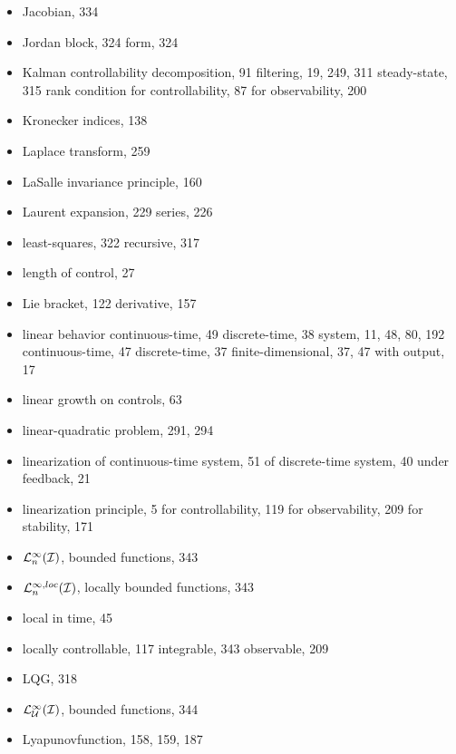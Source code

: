 \begin{itemize}
  \indexspace

  \item Jacobian, 334
  \item Jordan
    \subitem block, 324
    \subitem form, 324

  \indexspace

  \item Kalman
    \subitem controllability decomposition, 91
    \subitem filtering, 19, 249, 311
      \subsubitem steady-state, 315
    \subitem rank condition
      \subsubitem for controllability, 87
      \subsubitem for observability, 200
  \item Kronecker indices, 138

  \indexspace

  \item Laplace transform, 259
  \item LaSalle invariance principle, 160
  \item Laurent
    \subitem expansion, 229
    \subitem series, 226
  \item least-squares, 322
    \subitem recursive, 317
  \item length of control, 27
  \item Lie
    \subitem bracket, 122
    \subitem derivative, 157
  \item linear
    \subitem behavior
      \subsubitem continuous-time, 49
      \subsubitem discrete-time, 38
    \subitem system, 11, 48, 80, 192
      \subsubitem continuous-time, 47
      \subsubitem discrete-time, 37
      \subsubitem finite-dimensional, 37, 47
      \subsubitem with output, 17
  \item linear growth on controls, 63
  \item linear-quadratic problem, 291, 294
  \item linearization
    \subitem of con\-tin\-u\-ous-time system, 51
    \subitem of dis\-crete-time system, 40
    \subitem under feedback, 21
  \item linearization principle, 5
    \subitem for controllability, 119
    \subitem for observability, 209
    \subitem for stability, 171
  \item ${\cal L}^\infty _n({\cal I})$, bounded functions, 343
  \item ${\cal L}^{\infty ,loc}_n({\cal I})$, locally bounded functions, 
		343
  \item local in time, 45
  \item locally
    \subitem controllable, 117
    \subitem integrable, 343
    \subitem observable, 209
  \item LQG, 318
  \item ${\cal L}^\infty _{\cal U} ({\cal I})$, bounded functions, 344
  \item Lyapunov\longentry function, 158, 159, 187


\end{itemize}
